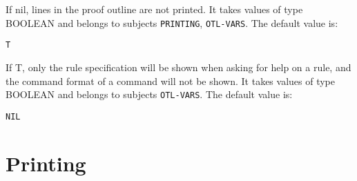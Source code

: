 \begin{description}
\item[PRINTLINEFLAG]  
If nil, lines in the proof outline are not printed.
It takes values of type BOOLEAN and belongs to subjects \texttt{PRINTING}, \texttt{OTL-VARS}.  The default value is: \begin{lstlisting}
T
\end{lstlisting}

\item[SHORT-HELP]  
If T, only the rule specification will be shown when asking for help
on a rule, and the command format of a command will not be shown.
It takes values of type BOOLEAN and belongs to subjects \texttt{OTL-VARS}.  The default value is: \begin{lstlisting}
NIL
\end{lstlisting}

\item
\end{description}

\section{Printing}

